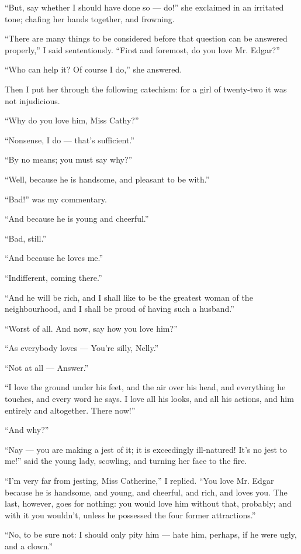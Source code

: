 \par “But, say whether I should have done so — do!” she exclaimed in an irritated tone; chafing her hands together, and frowning.
\par “There are many things to be considered before that question can be answered properly,” I said sententiously. “First and foremost, do you love Mr. Edgar?”
\par “Who can help it? Of course I do,” she answered.
\par Then I put her through the following catechism: for a girl of twenty-two it was not injudicious.
\par “Why do you love him, Miss Cathy?”
\par “Nonsense, I do — that's sufficient.”
\par “By no means; you must say why?”
\par “Well, because he is handsome, and pleasant to be with.”
\par “Bad!” was my commentary.
\par “And because he is young and cheerful.”
\par “Bad, still.”
\par “And because he loves me.”
\par “Indifferent, coming there.”
\par “And he will be rich, and I shall like to be the greatest woman of the neighbourhood, and I shall be proud of having such a husband.”
\par “Worst of all. And now, say how you love him?”
\par “As everybody loves — You're silly, Nelly.”
\par “Not at all — Answer.”
\par “I love the ground under his feet, and the air over his head, and everything he touches, and every word he says. I love all his looks, and all his actions, and him entirely and altogether. There now!”
\par “And why?”
\par “Nay — you are making a jest of it; it is exceedingly ill-natured! It's no jest to me!” said the young lady, scowling, and turning her face to the fire.
\par “I'm very far from jesting, Miss Catherine,” I replied. “You love Mr. Edgar because he is handsome, and young, and cheerful, and rich, and loves you. The last, however, goes for nothing: you would love him without that, probably; and with it you wouldn't, unless he possessed the four former attractions.”
\par “No, to be sure not: I should only pity him — hate him, perhaps, if he were ugly, and a clown.”
